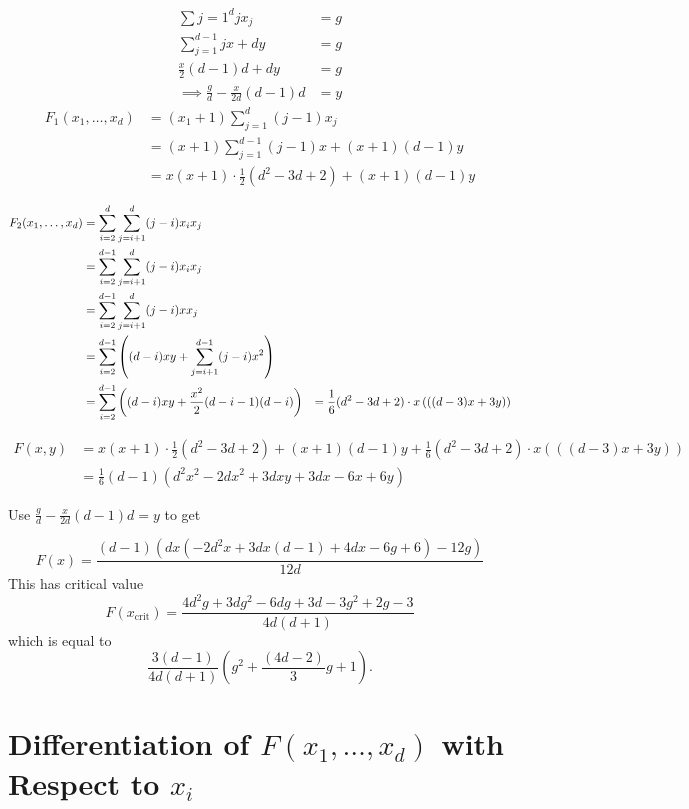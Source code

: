 \documentclass[11pt]{article}
\begin{document}
\begin{align*}
    \sum\limits{j=1}^d j x_j &= g \\
    \sum\limits_{j=1}^{d-1} j x  + d y &= g \\
    \frac{x}{2}(d-1)d + dy &= g\\
    \implies \frac{g}{d} - \frac{x}{2d}(d-1)d &= y  
\end{align*}
\begin{align*}
    F_1(x_1, \dots, x_{d}) &= (x_1 + 1)\sum\limits_{j=1}^{d} (j - 1) x_j \\
    &= (x + 1)\sum\limits_{j=1}^{d-1} (j - 1) x + (x + 1)(d - 1)y \\
    &= x(x+1) \cdot \frac{1}{2}(d^2 - 3d + 2) + (x+1)(d - 1)y
\end{align*}

\begin{align*}
    F_2(x_1, \dots, x_{d}) &= \sum\limits_{i = 2}^d\limits\sum\limits_{j=i+1}^d (j - i) x_i x_j \\
    &= \sum\limits_{i = 2}^{d-1}\limits\sum\limits_{j=i+1}^d (j - i) x_i x_j \\
    &= \sum\limits_{i = 2}^{d-1}\limits\sum\limits_{j=i+1}^d (j - i) x x_j \\
    &= \sum\limits_{i = 2}^{d-1}\left( (d-i)xy + \sum\limits_{j=i+1}^{d-1}(j - i) x^2\right)\\
    &= \sum\limits_{i = 2}^{d-1}\left( (d-i)xy + \frac{x^2}{2}(d-i-1)(d-i)\right)
    &= \frac{1}{6}(d^2 - 3d + 2) \cdot x \left( ((d - 3)x + 3y) \right)
\end{align*}

\begin{align*}
    F(x, y) &= x(x+1) \cdot \frac{1}{2}(d^2 - 3d + 2) + (x+1)(d - 1)y +  \frac{1}{6}(d^2 - 3d + 2) \cdot x \left( ((d - 3)x + 3y) \right) \\
    &= \frac{1}{6}(d - 1)\left(d^2x^2 - 2dx^2 + 3dxy + 3dx - 6x + 6y\right)
\end{align*}

Use \(\frac{g}{d} - \frac{x}{2d}(d-1)d = y\) to get

\[F(x) = \frac{(d - 1) \left( dx \left(-2d^2 x + 3dx(d - 1) + 4dx - 6g + 6 \right) - 12g \right)}{12d}
\]
This has critical value \[F(x_{\text{crit}}) = \frac{4d^2g + 3dg^2 - 6dg + 3d - 3g^2 + 2g - 3}{4d(d + 1)}
\] which is equal to \[\frac{3(d - 1)}{4d(d+1)}\left(g^2 + \frac{(4d - 2)}{3}g + 1\right).
\]

\newpage 
\section*{Differentiation of \( F(x_1, \dots, x_d) \) with Respect to \( x_i \)}
\end{document}
